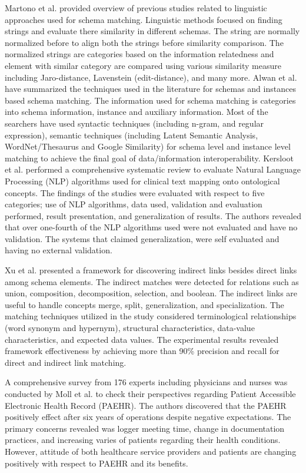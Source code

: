 \documentclass{ieeeaccess}
\begin{document}
Martono et al. \cite{martono2017review} provided overview of previous studies related to linguistic approaches used for schema matching. Linguistic methods focused on finding strings and evaluate there similarity in different schemas. The string are normally normalized before to align both the strings before similarity comparison. The normalized strings are categories based on the information relatedness and element with similar category are compared using various similarity measure including  Jaro-distance, Lavenstein (edit-distance), and many more. Alwan et al. \cite{alwan2017survey} have summarized the techniques used in the literature for schemas and instances based schema matching. The information used for schema matching is categories into  schema information, instance and auxiliary information. Most of the searchers have used syntactic techniques (including n-gram, and regular expression), semantic techniques (including Latent Semantic Analysis, WordNet/Thesaurus and Google Similarity) for schema level and instance level matching to achieve the final goal of data/information interoperability.  Kersloot et al. \cite{kersloot2020natural} performed a comprehensive systematic review to evaluate Natural Language Processing (NLP) algorithms used for clinical text mapping onto ontological concepts. The findings of the studies were evaluated with respect to five categories; use of NLP algorithms, data used, validation and evaluation performed, result presentation, and generalization of results. The authors revealed that over one-fourth of the NLP algorithms used were not evaluated and have no validation. The systems that claimed generalization, were self evaluated and having no external validation.  

Xu et al. \cite{xu2003discovering} presented a framework for discovering indirect links besides direct links among schema elements. The indirect matches were detected for relations such as union, composition, decomposition, selection, and boolean. The indirect links are useful to handle concepts merge, split, generalization, and specialization. The matching techniques utilized in the study considered terminological relationships (word synonym and hypernym), structural characteristics, data-value characteristics, and expected data values. The experimental results revealed framework effectiveness by achieving more than 90\% precision and recall for direct and indirect link matching. 

A comprehensive survey from 176 experts including physicians and nurses was conducted by Moll et al. \cite{moll2020oncology} to check their perspectives regarding Patient Accessible Electronic Health Record (PAEHR). The authors discovered that the PAEHR positively effect after six years of operations despite negative expectations. The primary concerns revealed was logger meeting time, change in documentation practices, and increasing varies of patients regarding their health conditions. However, attitude of both healthcare service providers and patients are changing positively with respect to PAEHR and its benefits. 
 
\end{document}
